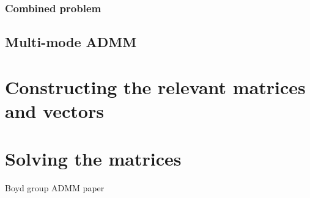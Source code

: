 \documentclass{article}
\begin{document}
\subsubsection{Combined problem}
\subsection{Multi-mode ADMM}
\begin{appendix}
\section{Constructing the relevant matrices and vectors}
\section{Solving the matrices}
\end{appendix}
\begin{thebibliography}{99}
 Boyd group ADMM paper
\end{thebibliography}
\end{document}
